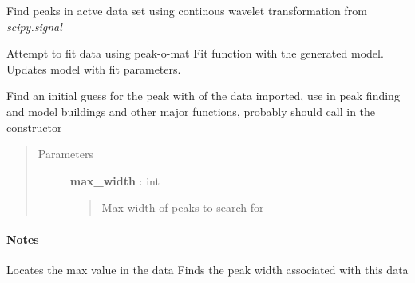 \documentclass[letterpaper,10pt,english]{sphinxmanual}
\begin{document}
\begin{fulllineitems}
\begin{fulllineitems}
\end{fulllineitems}


\begin{fulllineitems}
\label{spectra:spectra.Spectra.find_peaks}
Find peaks in actve data set using continous wavelet 
transformation from \emph{scipy.signal}

\end{fulllineitems}


\begin{fulllineitems}
\label{spectra:spectra.Spectra.fit_data}
Attempt to fit data using peak-o-mat Fit function with the 
generated model. Updates model with fit parameters.

\end{fulllineitems}


\begin{fulllineitems}
\label{spectra:spectra.Spectra.guess_peak_width}
Find an initial guess for the peak with of the data imported, 
use in peak finding and model buildings and other major functions, 
probably should call in the constructor
\begin{quote}\begin{description}
\item[{Parameters}] \leavevmode
\textbf{max\_width} : int
\begin{quote}

Max width of peaks to search for
\end{quote}

\end{description}\end{quote}
\paragraph{Notes}

Locates the max value in the data
Finds the peak width associated with this data

\end{fulllineitems}


\end{fulllineitems}
\end{document}
